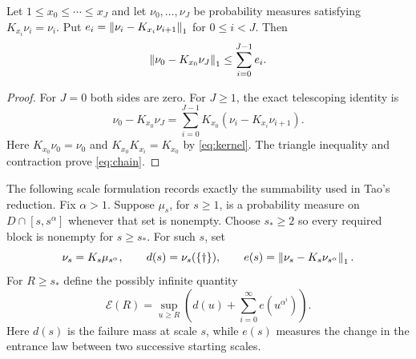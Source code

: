 \begin{proposition}\label{prop:chain}
Let $1\leq x_0\leq\cdots\leq x_J$ and let $\nu_0,\ldots,\nu_J$
be probability measures satisfying $K_{x_i}\nu_i=\nu_i$.
Put $e_i=\left\|\nu_i-K_{x_i}\nu_{i+1}\right\|_1$ for $0\leq i<J$.
Then
\begin{equation}\label{eq:chain}
 \left\|\nu_0-K_{x_0}\nu_J\right\|_1\leq\sum_{i=0}^{J-1}e_i.
\end{equation}
\end{proposition}
\begin{proof}
For $J=0$ both sides are zero.  For $J\geq1$, the exact telescoping
identity is
\[
 \nu_0-K_{x_0}\nu_J=
 \sum_{i=0}^{J-1}K_{x_0}(\nu_i-K_{x_i}\nu_{i+1}).
\]
Here $K_{x_0}\nu_0=\nu_0$ and $K_{x_0}K_{x_i}=K_{x_0}$ by
\eqref{eq:kernel}.  The triangle inequality and contraction prove
\eqref{eq:chain}.
\end{proof}

The following scale formulation records exactly the summability used in
Tao's reduction.  Fix $\alpha>1$.  Suppose $\mu_s$, for $s\geq1$, is a probability
measure on $D\cap[s,s^\alpha]$ whenever that set is nonempty.  Choose
$s_*\geq2$ so every required block is nonempty for $s\geq s_*$.
For such $s$, set
\[
 \nu_s=K_s\mu_{s^\alpha},\qquad d(s)=\nu_s(\{\dagger\}),\qquad
 e(s)=\left\|\nu_s-K_s\nu_{s^\alpha}\right\|_1.
\]
For $R\geq s_*$ define the possibly infinite quantity
\begin{equation}\label{eq:error-tail}
 \mathcal E(R)=\sup_{u\geq R}
 \left(d(u)+\sum_{i=0}^{\infty}e(u^{\alpha^i})\right).
\end{equation}
Here $d(s)$ is the failure mass at scale $s$, while $e(s)$ measures the
change in the entrance law between two successive starting scales.

